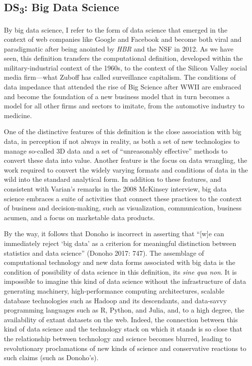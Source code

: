 \documentclass[
  letterpaper,
]{report}
\begin{document}
\hypertarget{ds3-big-data-science}{%
\subsection{\texorpdfstring{DS\textsubscript{3}: Big Data
Science}{DS3: Big Data Science}}\label{ds3-big-data-science}}

By big data science, I refer to the form of data science that emerged in
the context of web companies like Google and Facebook and become both
viral and paradigmatic after being anointed by \emph{HBR} and the NSF in
2012. As we have seen, this definition transfers the computational
definition, developed within the military-industrial context of the
1960s, to the context of the Silicon Valley social media firm---what
Zuboff has called surveillance capitalism. The conditions of data
impedance that attended the rise of Big Science after WWII are embraced
and become the foundation of a new business model that in turn becomes a
model for all other firms and sectors to imitate, from the automotive
industry to medicine.

One of the distinctive features of this definition is the close
association with big data, in perception if not always in reality, as
both a set of new technologies to manage so-called 3D data and a set of
``unreasonably effective'' methods to convert these data into value.
Another feature is the focus on data wrangling, the work required to
convert the widely varying formats and conditions of data in the wild
into the standard analytical form. In addition to these features, and
consistent with Varian's remarks in the 2008 McKinsey interview, big
data science embraces a suite of activities that connect these practices
to the context of business and decision-making, such as visualization,
communication, business acumen, and a focus on marketable data products.

By the way, it follows that Donoho is incorrect in asserting that
``{[}w{]}e can immediately reject `big data' as a criterion for
meaningful distinction between statistics and data science'' (Donoho
2017: 747). The assemblage of computational technology and new data
forms associated with big data is the condition of possibility of data
science in this definition, its \emph{sine qua non}. It is impossible to
imagine this kind of data science without the infrastructure of data
generating machinery, high-performance computing architectures, scalable
database technologies such as Hadoop and its descendants, and data-savvy
programming languages such as R, Python, and Julia, and, to a high
degree, the availability of extant datasets on the web. Indeed, the
connection between this kind of data science and the technology stack on
which it stands is so close that the relationship between technology and
science becomes blurred, leading to revolutionary proclamations of new
kinds of science and conservative reactions to such claims (such as
Donoho's).
\end{document}
